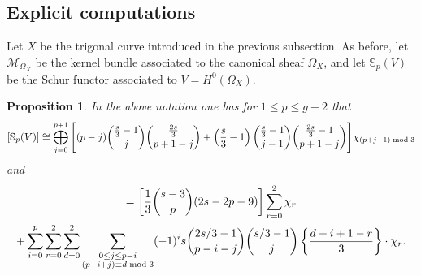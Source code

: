 \documentclass[10pt]{amsart}
\newtheorem{proposition}[theorem]{Proposition}
\theoremstyle{definition}
\begin{document}
\subsection{Explicit computations}
Let $X$ be the trigonal curve introduced in the previous subsection. As before, let $\mathcal{M}_{\Omega_X}$ be the kernel bundle associated to the canonical sheaf $\Omega_X$, and let $\mathbb{S}_p(V)$ be the Schur functor associated to $V=H^0(\Omega_X)$.
\begin{proposition}
In the above notation one has for $1\leq p \leq g-2$ that
\[
[\mathbb{S}_p(V)] \cong 
\bigoplus_{j=0}^{p+1} \Bigg[ 
(p-j) \binom{\frac{s}{3}-1}{j} \binom{\frac{2s}{3}}{p+1-j} 
+ \left(\frac{s}{3}-1\right) \binom{\frac{s}{3}-1}{j-1} \binom{\frac{2s}{3}-1}{p+1-j} 
\Bigg] \chi_{(p+j+1) \;{\rm mod}\; 3}
\]
and
\begin{multline*}
[H^0\big(\bigwedge^p\mathcal{M}_{\Omega_X}\otimes\Omega_X^{\otimes 2}\big)] = 
\left[ \frac{1}{3} \binom{s-3}{p} (2s - 2p - 9) \right] \sum_{r=0}^2\chi_r \\
+ \sum_{i=0}^p \sum_{r=0}^2 \sum_{d=0}^{2} \sum_{\substack{0 \le j \le p-i \\ (p-i+j) \equiv d \;{\rm mod}\; 3}}  (-1)^i s \binom{2s/3 - 1}{p-i-j} \binom{s/3 - 1}{j}
\left\{ \frac{d+i+1-r}{3} \right\} \cdot \chi_r.
\end{multline*}
\end{proposition}
\end{document}

